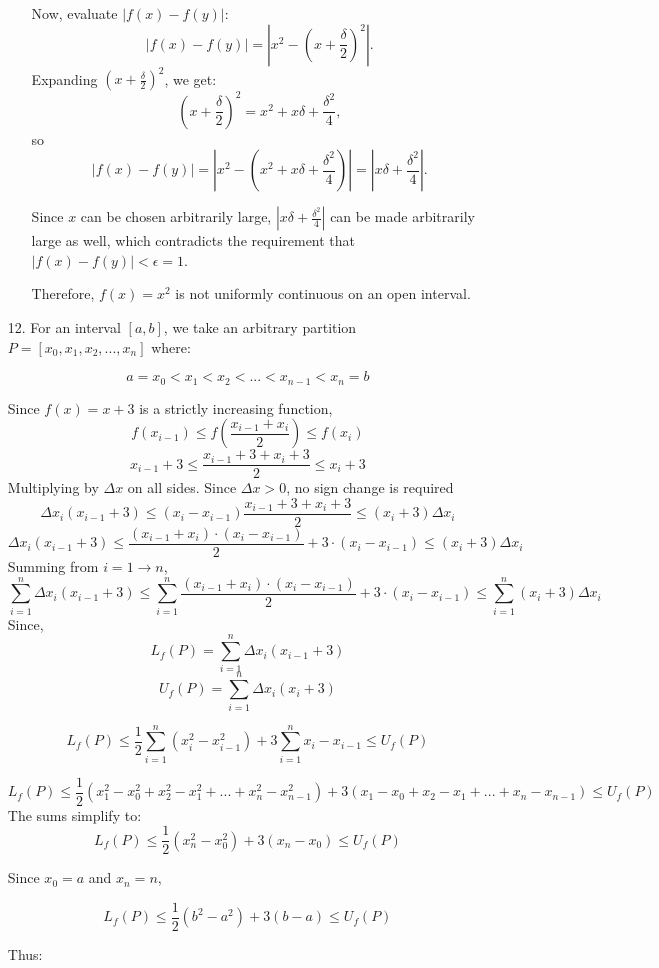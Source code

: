 \documentclass[12pt]{article}
\begin{document}
\begin{enumerate}[start=1,label={\bfseries. },leftmargin=1in]
\begin{enumerate}
Now, evaluate \( |f(x) - f(y)| \):
\[
|f(x) - f(y)| = |x^2 - \left(x + \frac{\delta}{2}\right)^2|.
\]
Expanding \( (x + \frac{\delta}{2})^2 \), we get:
\[
\left(x + \frac{\delta}{2}\right)^2 = x^2 + x \delta + \frac{\delta^2}{4},
\]
so
\[
|f(x) - f(y)| = \left| x^2 - \left( x^2 + x \delta + \frac{\delta^2}{4} \right) \right| = |x \delta + \frac{\delta^2}{4}|.
\]

Since \( x \) can be chosen arbitrarily large, \( |x \delta + \frac{\delta^2}{4}| \) can be made arbitrarily large as well, which contradicts the requirement that \( |f(x) - f(y)| < \epsilon = 1 \).

Therefore, \( f(x) = x^2 \) is not uniformly continuous on an open interval.

\end{enumerate}
\item [12. ]
For an interval $[a,b]$, we take an arbitrary partition $P = [x_0, x_1, x_2,...,x_n]$ where:

\[
a = x_0 < x_1 < x_2 <...<x_{n-1}<x_n = b
\]

Since $f(x) = x + 3$ is a strictly increasing function,
\[
f(x_{i-1}) \leq f\left(\frac{x_{i-1} + x_i}{2}\right) \leq f(x_i)
\]
\[
x_{i-1} + 3 \leq \frac{x_{i-1}  +3 +x_i + 3 }{2} \leq x_i + 3
\]
Multiplying by $\Delta x$ on all sides. Since $\Delta x > 0$, no sign change is required
\[
\Delta x_i(x_{i-1} + 3) \leq (x_i - x_{i-1})\frac{x_{i-1}  +3 +x_i + 3 }{2} \leq(x_i + 3)\Delta x_i
\]
\[
\Delta x_i(x_{i-1} + 3) \leq \frac{(x_{i-1} +x_i) \cdot(x_i - x_{i-1})}{2} + 3\cdot(x_i - x_{i-1}) \leq (x_i + 3)\Delta x_i
\]
Summing from $i = 1\to n$,
\[
\sum_{i=1}^n\Delta x_i(x_{i-1} + 3) \leq \sum_{i=1}^n\frac{(x_{i-1} +x_i) \cdot(x_i - x_{i-1})}{2} + 3\cdot(x_i - x_{i-1}) \leq \sum_{i=1}^n(x_i + 3)\Delta x_i
\]
Since,
\[
L_f(P)=\sum_{i=1}^n\Delta x_i(x_{i-1} + 3)
\]
\[
U_f(P)=\sum_{i=1}^n\Delta x_i(x_{i} + 3)
\]

\[
L_f(P) \leq \frac{1}{2}\sum_{i=1}^n (x_i^2 - x_{i-1}^2) + 3\sum_{i=1}^n x_i - x_{i-1} \leq U_f(P)
\]

\[
L_f(P) \leq \frac{1}{2}( x_1^2 - x_0^2 + x_2 ^2 - x_1^2 + ... +x_n^2 - x_{n-1}^2) + 3(x_1 - x_0 + x_2 - x_1 + ... +x_n - x_{n-1})
\leq U_f(P)
\] 
The sums simplify to:
\[
L_f(P) \leq \frac{1}{2}(x_n^2 - x_0^2) + 3(x_n - x_0) \leq U_f(P)
\]

Since $x_0 = a$ and $x_n = n$,

\[
L_f(P) \leq \frac{1}{2}(b^2 - a^2) + 3(b-a)\leq U_f(P) 
\]

Thus:


\end{enumerate}
\end{document}
